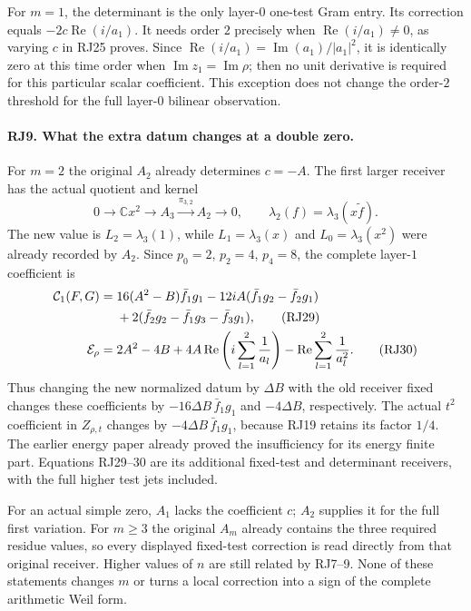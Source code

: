 \documentclass[11pt,a4paper]{article}
\theoremstyle{definition}\newtheorem{definition}[theorem]{Definition}
\begin{document}
For $m=1$, the determinant is the only layer-$0$ one-test Gram
entry. Its correction equals
$-2c\operatorname{Re}(i/a_1)$. It needs order $2$ precisely
when $\operatorname{Re}(i/a_1)\ne0$, as varying $c$ in RJ25
proves. Since $\operatorname{Re}(i/a_1)=
\operatorname{Im}(a_1)/|a_1|^2$, it is identically zero at this
time order when $\operatorname{Im}z_1=\operatorname{Im}\rho$;
then no unit derivative is required for this particular scalar
coefficient. This exception does not change the order-$2$
threshold for the full layer-$0$ bilinear observation.

\paragraph{RJ9. What the extra datum changes at a double zero.}
For $m=2$ the original $A_2$ already determines $c=-A$.
The first larger receiver has the actual quotient and kernel
\[
 0\longrightarrow\mathbb Cx^2\longrightarrow A_3
        \xrightarrow{\pi_{3,2}}A_2\longrightarrow0,
 \qquad\lambda_2(f)=\lambda_3(x\widetilde f).
 \tag{RJ28}
\]
The new value is $L_2=\lambda_3(1)$, while
$L_1=\lambda_3(x)$ and $L_0=\lambda_3(x^2)$ were already
recorded by $A_2$. Since $p_0=2$, $p_2=4$, $p_4=8$,
the complete layer-$1$ coefficient is
\begin{align}
 \mathcal C_1(F,G)={}&16(A^2-B)\bar f_1g_1
       -12iA(\bar f_1g_2-\bar f_2g_1)\notag\\
 &+2(\bar f_2g_2-\bar f_1g_3-\bar f_3g_1),
 \tag{RJ29}\\
 \mathcal E_\rho={}&2A^2-4B
       +4A\operatorname{Re}\left(i\sum_{l=1}^2\frac1{a_l}\right)
       -\operatorname{Re}\sum_{l=1}^2\frac1{a_l^2}.
 \tag{RJ30}
\end{align}
Thus changing the new normalized datum by $\Delta B$ with the
old receiver fixed changes these coefficients by
$-16\Delta B\,\bar f_1g_1$ and $-4\Delta B$, respectively.
The actual $t^2$ coefficient in $Z_{\rho,t}$ changes by
$-4\Delta B\,\bar f_1g_1$, because RJ19 retains its factor
$1/4$. The earlier energy paper already proved the insufficiency
for its energy finite part. Equations RJ29--30 are its additional
fixed-test and determinant receivers, with the full higher test
jets included.

For an actual simple zero, $A_1$ lacks the coefficient $c$;
$A_2$ supplies it for the full first variation. For $m\ge3$ the
original $A_m$ already contains the three required residue values,
so every displayed fixed-test correction is read directly from
that original receiver. Higher values of $n$ are still related by
RJ7--9. None of these statements changes $m$ or turns a local
correction into a sign of the complete arithmetic Weil form.
\end{document}
